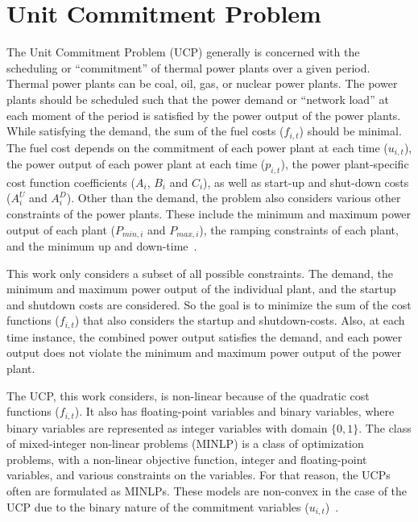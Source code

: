 \section{Unit Commitment Problem}
\label{fundamentals:ucp}

The Unit Commitment Problem (UCP) generally is concerned with the scheduling or ``commitment'' of thermal power plants over a given period.
Thermal power plants can be coal, oil, gas, or nuclear power plants.
The power plants should be scheduled such that the power demand or ``network load'' at each moment of the period is satisfied by the power output of the power plants.
While satisfying the demand, the sum of the fuel costs ($f_{i, t}$) should be minimal.
The fuel cost depends on the commitment of each power plant at each time ($u_{i, t}$), the power output of each power plant at each time ($p_{i, t}$), the power plant-specific cost function coefficients ($A_i$, $B_i$ and $C_i$), as well as start-up and shut-down costs ($A_{i}^{U}$ and $A_{i}^{D}$).
Other than the demand, the problem also considers various other constraints of the power plants.
These include the minimum and maximum power output of each plant ($P_{min, i}$ and $P_{max, i}$), the ramping constraints of each plant, and the minimum up and down-time~\cite{Baldick1995}.

This work only considers a subset of all possible constraints.
The demand, the minimum and maximum power output of the individual plant, and the startup and shutdown costs are considered.
So the goal is to minimize the sum of the cost functions ($f_{i, t}$) that also considers the startup and shutdown-costs.
Also, at each time instance, the combined power output satisfies the demand, and each power output does not violate the minimum and maximum power output of the power plant.

The UCP, this work considers, is non-linear because of the quadratic cost functions ($f_{i, t}$).
It also has floating-point variables and binary variables, where binary variables are represented as integer variables with domain $\{0, 1\}$.
The class of mixed-integer non-linear problems (MINLP) is a class of optimization problems, with a non-linear objective function, integer and floating-point variables, and various constraints on the variables.
For that reason, the UCPs often are formulated as MINLPs.
These models are non-convex in the case of the UCP due to the binary nature of the commitment variables ($u_{i, t}$)~\cite{Baldick1995, Abujarad2017}.
